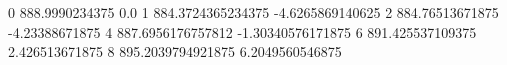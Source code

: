 0 888.9990234375 0.0
1 884.3724365234375 -4.6265869140625
2 884.76513671875 -4.23388671875
4 887.6956176757812 -1.30340576171875
6 891.425537109375 2.426513671875
8 895.2039794921875 6.2049560546875

